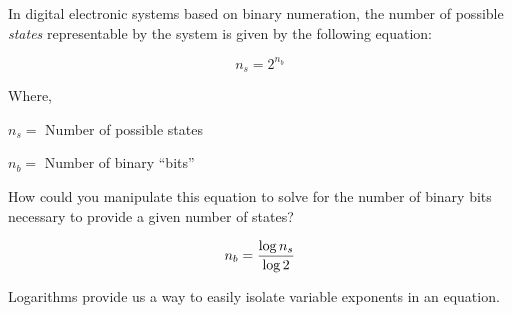 

In digital electronic systems based on binary numeration, the number of possible {\it states} representable by the system is given by the following equation:

$$n_s = 2^{n_b}$$

\noindent
Where,

$n_s =$ Number of possible states

$n_b =$ Number of binary ``bits''

\vskip 10pt

How could you manipulate this equation to solve for the number of binary bits necessary to provide a given number of states?







$$n_b = {\log n_s \over \log 2}$$







Logarithms provide us a way to easily isolate variable exponents in an equation.





